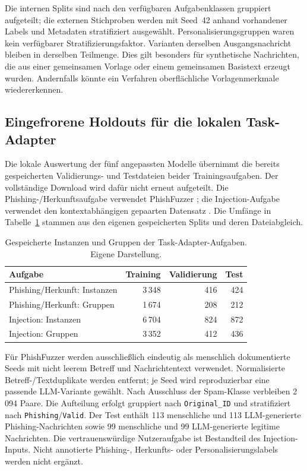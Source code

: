 \documentclass[12pt,twoside=false,a4paper,parskip]{scrbook}
\begin{document}
Die internen Splits sind nach den verfügbaren Aufgabenklassen gruppiert aufgeteilt; die externen Stichproben werden mit Seed~42 anhand vorhandener Labels und Metadaten stratifiziert ausgewählt. Personalisierungsgruppen waren kein verfügbarer Stratifizierungsfaktor. Varianten derselben Ausgangsnachricht bleiben in derselben Teilmenge. Dies gilt besonders für synthetische Nachrichten, die aus einer gemeinsamen Vorlage oder einem gemeinsamen Basistext erzeugt wurden. Andernfalls könnte ein Verfahren oberflächliche Vorlagenmerkmale wiedererkennen.

\subsection{Eingefrorene Holdouts für die lokalen Task-Adapter}\label{sec:adapter-heldouts}

Die lokale Auswertung der fünf angepassten Modelle übernimmt die bereits gespeicherten Validierungs- und Testdateien beider Trainingsaufgaben. Der vollständige Download wird dafür nicht erneut aufgeteilt. Die Phishing-/Herkunftsaufgabe verwendet PhishFuzzer \cite{toth2025phishfuzzer}; die Injection-Aufgabe verwendet den kontextabhängigen gepaarten Datensatz \cite{abdelnabi2026agents}. Die Umfänge in Tabelle~\ref{tab:adapter-holdouts} stammen aus den eigenen gespeicherten Splits und deren Dateiabgleich.

\begin{table}[htbp]
\centering
\caption{Gespeicherte Instanzen und Gruppen der Task-Adapter-Aufgaben. Eigene Darstellung.}
\label{tab:adapter-holdouts}
\begin{tabular}{lrrr}
\toprule
Aufgabe & Training & Validierung & Test \\
\midrule
Phishing/Herkunft: Instanzen & 3\,348 & 416 & 424 \\
Phishing/Herkunft: Gruppen & 1\,674 & 208 & 212 \\
Injection: Instanzen & 6\,704 & 824 & 872 \\
Injection: Gruppen & 3\,352 & 412 & 436 \\
\bottomrule
\end{tabular}
\end{table}

Für PhishFuzzer werden ausschließlich eindeutig als menschlich dokumentierte Seeds mit nicht leerem Betreff und Nachrichtentext verwendet. Normalisierte Betreff-/Textduplikate werden entfernt; je Seed wird reproduzierbar eine passende LLM-Variante gewählt. Nach Ausschluss der Spam-Klasse verbleiben 2\,094 Paare. Die Aufteilung erfolgt gruppiert nach \texttt{Original\_ID} und stratifiziert nach \texttt{Phishing}/\texttt{Valid}. Der Test enthält 113 menschliche und 113 LLM-generierte Phishing-Nachrichten sowie 99 menschliche und 99 LLM-generierte legitime Nachrichten. Die vertrauenswürdige Nutzeraufgabe ist Bestandteil des Injection-Inputs. Nicht annotierte Phishing-, Herkunfts- oder Personalisierungslabels werden nicht ergänzt.
\end{document}
